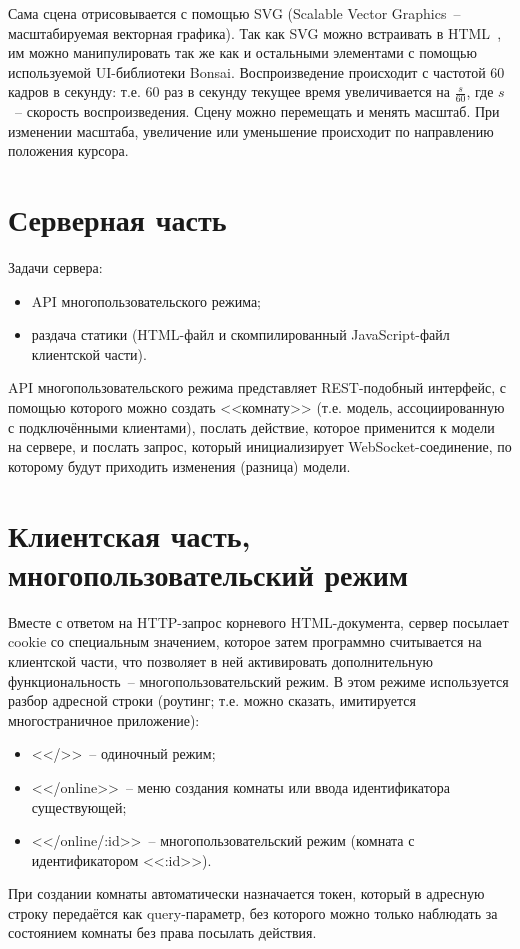 Сама сцена отрисовывается с помощью SVG (Scalable Vector Graphics~-- масштабируемая векторная графика).
Так как SVG можно встраивать в HTML~\cite{mdnsvgtag}, им можно манипулировать так же как и остальными элементами с помощью используемой UI-библиотеки Bonsai.
Воспроизведение происходит с частотой 60 кадров в секунду:
т.е. 60 раз в секунду текущее время увеличивается на \(\frac{s}{60}\), где \(s\)~-- скорость воспроизведения.
Сцену можно перемещать и менять масштаб. При изменении масштаба, увеличение или уменьшение происходит по направлению положения курсора.

\section{Серверная часть}\label{serverimpl}

Задачи сервера:

\begin{itemize}
    \item API многопользовательского режима;
    \item раздача статики (HTML-файл и скомпилированный JavaScript-файл клиентской части).
\end{itemize}

API многопользовательского режима представляет REST-подобный интерфейс,
с помощью которого можно создать <<комнату>> (т.е. модель, ассоциированную с подключёнными клиентами),
послать действие, которое применится к модели на сервере, и послать запрос, который инициализирует WebSocket-соединение,
по которому будут приходить изменения (разница) модели.

\section{Клиентская часть, многопользовательский режим}\label{clientonlineimpl}

\TODO

Вместе с ответом на HTTP-запрос корневого HTML-документа, сервер посылает cookie со специальным значением,
которое затем программно считывается на клиентской части, что позволяет в ней активировать дополнительную функциональность~--
многопользовательский режим. В этом режиме используется разбор адресной строки (роутинг; т.е. можно сказать,
имитируется многостраничное приложение):

\begin{itemize}
    \item <</>>~-- одиночный режим;
    \item <</online>>~-- меню создания комнаты или ввода идентификатора существующей;
    \item <</online/:id>>~-- многопользовательский режим (комната с идентификатором <<:id>>).
\end{itemize}

При создании комнаты автоматически назначается токен, который в адресную строку передаётся как query-параметр,
без которого можно только наблюдать за состоянием комнаты без права посылать действия.

\TODO
